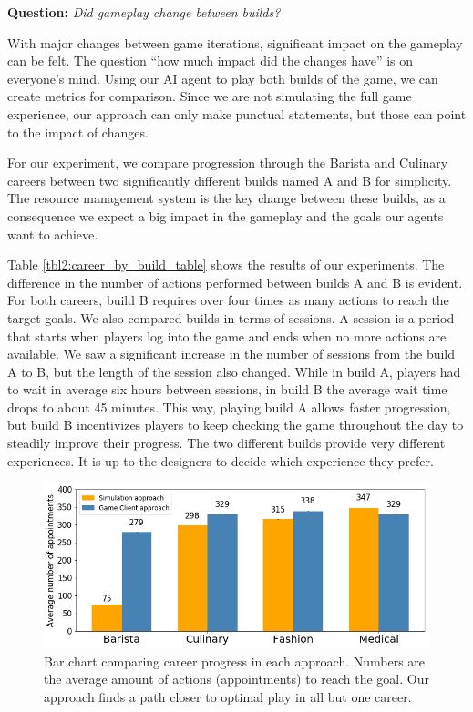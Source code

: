 \documentclass[letterpaper]{article} %
\begin{document}
\textbf{Question:} {\em Did gameplay change between builds?}

With major changes between game iterations, significant impact on the gameplay can be felt. The question ``how much impact did the changes have'' is on everyone's mind. Using our AI agent to play both builds of the game, we can create metrics for comparison. Since we are not simulating the full game experience, our approach can only make punctual statements, but those can point to the impact of changes.

For our experiment, we compare progression through the Barista and Culinary careers between two significantly different builds named A and B for simplicity. The resource management system is the key change between these builds, as a consequence we expect a big impact in the gameplay and the goals our agents want to achieve.


Table \ref{tbl2:career_by_build_table} shows the results of our experiments. The difference in the number of actions performed between builds A and B is evident. For both careers, build B requires over four times as many actions to reach the target goals. We also compared builds in terms of sessions. A session is a period that starts when players log into the game and ends when no more actions are available. We saw a significant increase in the number of sessions from the build A to B, but the length of the session also changed. While in build A, players had to wait in average six hours between sessions, in build B the average wait time drops to about 45 minutes. This way, playing build A allows faster progression, but build B incentivizes players to keep checking the game throughout the day to steadily improve their progress. The two different builds provide very different experiences. It is up to the designers to decide which experience they prefer.


\begin{figure}[t]
  \centering
  \includegraphics[width=1.0\linewidth]{images/career_approach_comparison.png}
  \caption{Bar chart comparing career progress in each approach. Numbers are the average amount of actions (appointments) to reach the goal. Our approach finds a path closer to optimal play in all but one career.}
  \label{Figure:career_approach_comp}
\end{figure}
\end{document}
